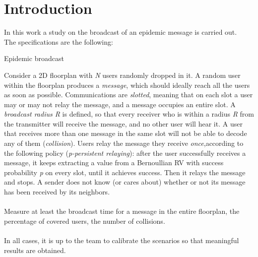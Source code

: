 %
\chapter{Introduction}

In this work a study on the broadcast of an epidemic message is carried out.\\
The specifications are the following:\\
\begin{displayquote}
\begin{specifications}
{\Large Epidemic broadcast}

Consider a 2D floorplan with \textit{N} users randomly dropped in it. A random user within the floorplan produces a \textit{message}, which should ideally reach all the users as soon as possible. Communications are \textit{slotted},  meaning  that  on  each  slot  a  user  may  or  may  not  relay  the  message,  and  a  message occupies  an  entire  slot.  A \textit{broadcast radius R} is  defined,  so  that  every  receiver  who  is  within  a radius \textit{R} from  the  transmitter  will  receive  the  message,  and no other user will  hear  it.  A  user  that receives more than one message in the same slot will not be able to decode any of them (\textit{collision}).
Users  relay  the  message  they  receive \textit{once},according  to  the  following  policy  (\textit{p-persistent relaying}):  after  the  user  successfully  receives  a  message,  it keeps extracting a  value  from  a Bernoullian RV with success probability \textit{p} on every slot, until it achieves success. Then it relays the message  and  stops. A  sender  does  not  know  (or  cares  about)  whether  or  not  its  message  has  been received by its neighbors.\\
\\
Measure at least the broadcast time for a message in the entire floorplan, the percentage of covered users, the number of collisions.\\
\\
In all cases, it is up to the team to calibrate the scenarios so that meaningful results are obtained.\\
\end{specifications}
\end{displayquote}
